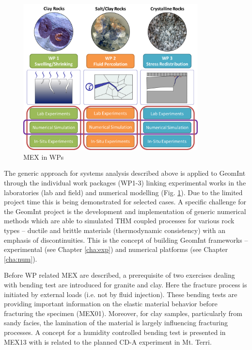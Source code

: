 \begin{figure}
\includegraphics[width=0.85\textwidth]{figures/geomint-mex-b.png}
\caption{MEX in WPs}
\label{fig:mex-concept-wps}
\end{figure}

The generic approach for systems analysis described above is applied to GeomInt through the individual work packages (WP1-3) linking experimental works in the laboratories (lab and field) and numerical modelling (Fig. \ref{fig:mex-concept-wps}). Due to the limited project time this is being demonstrated for selected cases. A specific challenge for the GeomInt project is the development and implementation of generic numerical methods which are able to simulated THM coupled processes for various rock types – ductile and brittle materials (thermodynamic consistency) with an emphasis of discontinuities. This is the concept of building GeomInt frameworks – experimental (see Chapter \ref{cha:exp}) and numerical platforms (see Chapter \ref{cha:num}).

Before WP related MEX are described, a prerequisite of two exercises dealing with bending test are introduced for granite and clay. Here the fracture process is initiated by external loads (i.e. not by fluid injection). These bending tests are providing important information on the elastic material behavior before fracturing the specimen (MEX01). Moreover, for clay samples, particularly from sandy facies, the lamination of the material is largely influencing fracturing processes. A concept for a humidity controlled bending test is presented in MEX13 with is related to the planned CD-A experiment in Mt. Terri.


